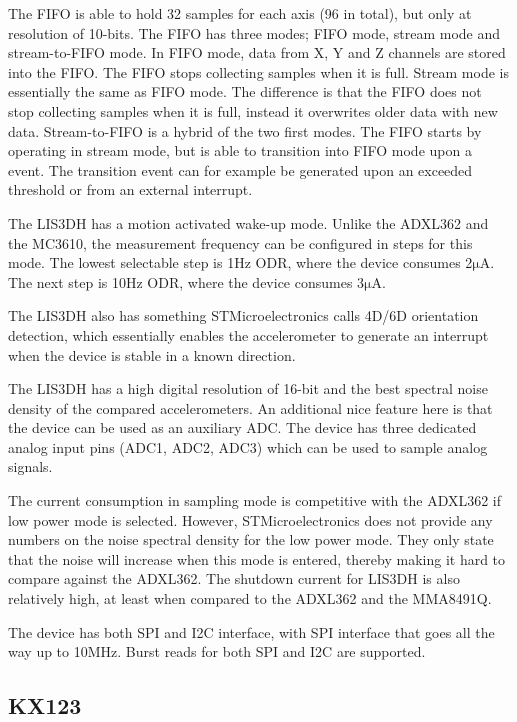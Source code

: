 The FIFO is able to hold 32 samples for each axis (96 in total), but only at resolution of 10-bits. The FIFO has three modes; FIFO mode, stream mode and stream-to-FIFO mode. In FIFO mode, data from X, Y and Z channels are stored into the FIFO. The FIFO stops collecting samples when it is full. Stream mode is essentially the same as FIFO mode. The difference is that the FIFO does not stop collecting samples when it is full, instead it overwrites older data with new data. Stream-to-FIFO is a hybrid of the two first modes. The FIFO starts by operating in stream mode, but is able to transition into FIFO mode upon a event. The transition event can for example be generated upon an exceeded threshold or from an external interrupt.

The LIS3DH has a motion activated wake-up mode. Unlike the ADXL362 and the MC3610, the measurement frequency can be configured in steps for this mode. The lowest selectable step is 1Hz ODR, where the device consumes 2$\si{\micro\ampere}$. The next step is 10Hz ODR, where the device consumes 3$\si{\micro\ampere}$. 

The LIS3DH also has something STMicroelectronics calls 4D/6D orientation detection, which essentially enables the accelerometer to generate an interrupt when the device is stable in a known direction. 

The LIS3DH has a high digital resolution of 16-bit and the best spectral noise density of the compared accelerometers. An additional nice feature here is that the device can be used as an auxiliary ADC. The device has three dedicated analog input pins (ADC1, ADC2, ADC3) which can be used to sample analog signals. 

The current consumption in sampling mode is competitive with the ADXL362 if low power mode is selected. However, STMicroelectronics does not provide any numbers on the noise spectral density for the low power mode. They only state that the noise will increase when this mode is entered, thereby making it hard to compare against the ADXL362. The shutdown current for LIS3DH is also relatively high, at least when compared to the ADXL362 and the MMA8491Q. 

The device has both SPI and I2C interface, with SPI interface that goes all the way up to 10MHz. Burst reads for both SPI and I2C are supported.

\subsection{KX123}

